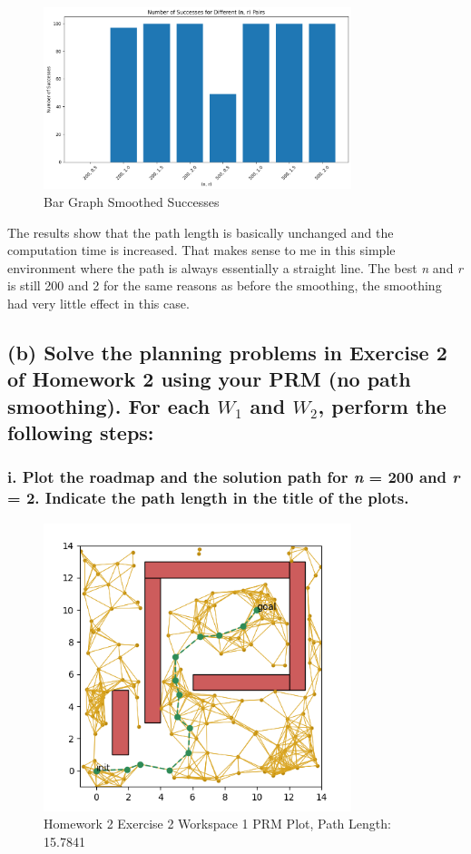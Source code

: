 \documentclass{article}
\begin{document}
\begin{figure}[h]
    \centering
    \includegraphics[width=0.8\textwidth]{e1a4successes.png}
    \caption{Bar Graph Smoothed Successes}
    \label{fig:e1a4successes}
\end{figure}

The results show that the path length is basically unchanged and the computation time is increased.
That makes sense to me in this simple environment where the path is always essentially a straight line.
The best \textit{n} and \textit{r} is still 200 and 2 for the same reasons as before the smoothing, the smoothing had very little effect in this case.

\subsection*{(b) Solve the planning problems in \textbf{Exercise 2} of \textbf{Homework 2} using your PRM (no path smoothing). For each $\mathit{W}_1$ and $\mathit{W}_2$, perform the following steps:}

\subsubsection*{i. Plot the roadmap and the solution path for \textit{n} = 200 and \textit{r} = 2. Indicate the path length in the title of the plots.}

\begin{figure}[h]
    \centering
    \includegraphics[width=0.8\textwidth]{e1b1plot.png}
    \caption{Homework 2 Exercise 2 Workspace 1 PRM Plot, Path Length: 15.7841}
    \label{fig:e1b1plot}
\end{figure}
\end{document}
